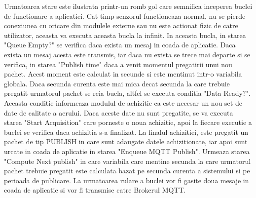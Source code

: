 Urmatoarea stare este ilustrata printr-un romb gol care semnifica inceperea buclei de functionare a aplicatiei. Cat timp senzorul functioneaza normal, nu se pierde 
conexiunea cu oricare din modulele externe sau nu este actionat fizic de catre utilizator, aceasta va executa aceasta bucla la infinit. In aceasta bucla, in starea 
"Queue Empty?" se verifica daca exista un mesaj in coada de aplicatie. Daca exista un mesaj acesta este transmis, iar daca nu exista se trece mai departe si se verifica, 
in starea "Publish time" daca a venit momentul pregatirii unui nou pachet. Acest moment este calculat in secunde si este mentinut intr-o variabila globala. Daca 
secunda curenta este mai mica decat secunda la care trebuie pregatit urmatorul pachet se reia bucla, altfel se executa conditia "Data Ready?". Aceasta conditie 
informeaza modulul de achizitie ca este necesar un nou set de date de calitate a aerului. Daca aceste date nu sunt pregatite, se va executa starea "Start Acquisition" 
care porneste o noua achizitie, apoi la fiecare executie a buclei se verifica daca achizitia s-a finalizat. La finalul achizitiei, este pregatit un pachet de tip 
PUBLISH in care sunt adaugate datele achizitionate, iar apoi sunt urcate in coada de aplicatie in starea "Enqueue MQTT Publish". Urmeaza starea "Compute Next publish" 
in care variabila care mentine secunda la care urmatorul pachet trebuie pregatit este calculata bazat pe secunda curenta a sistemului si pe perioada de publicare. La 
urmatoarea rulare a buclei vor fi gasite doua mesaje in coada de aplicatie si vor fi transmise catre Brokerul MQTT.
